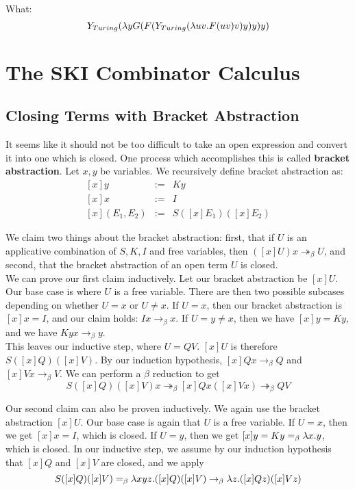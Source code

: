 What:
\begin{equation*}
  Y_{Turing} (\lambda y G(F(Y_{Turing}(\lambda uv.F(uv)v)y)y)y)
\end{equation*}

\section{The SKI Combinator Calculus}
\subsection{Closing Terms with Bracket Abstraction}
It seems like it should not be too difficult to take an open expression and convert it into one which is closed. One process which accomplishes this is called \textbf{bracket abstraction}. Let $x,y$ be variables. We recursively define bracket abstraction as:
\begin{eqnarray*}
  {[x]}y &:=& Ky\\
  {[x]}x &:=& I\\
  {[x]}(E_1,E_2) &:=& S([x]E_1)([x]E_2)
\end{eqnarray*}

We claim two things about the bracket abstraction: first, that if $U$ is an applicative combination of $S,K,I$ and free variables, then $([x]U)x \twoheadrightarrow_\beta U$, and second, that the bracket abstraction of an open term $U$ is closed.\\

We can prove our first claim inductively. Let our bracket abstraction be $[x]U$. Our base case is where $U$ is a free variable. There are then two possible subcases depending on whether $U = x$ or $U \neq x$. If $U = x$, then our bracket abstraction is $[x]x = I$, and our claim holds: $Ix \rightarrow_\beta x$. If $U = y \neq x$, then we have $[x]y = Ky$, and we have $Kyx \rightarrow_\beta y$.\\

This leaves our inductive step, where $U = QV$. $[x]U$ is therefore $S([x]Q)([x]V)$. By our induction hypothesis, $[x]Qx \rightarrow_\beta Q$ and $[x]Vx \rightarrow_\beta V$. We can perform a $\beta$ reduction to get
\begin{equation*}
  S([x]Q)([x]V)x \twoheadrightarrow_\beta [x]Qx([x]Vx) \twoheadrightarrow_\beta QV
\end{equation*}

Our second claim can also be proven inductively. We again use the bracket abstraction $[x]U$. Our base case is again that $U$ is a free variable. If $U = x$, then we get $[x]x = I$, which is closed. If $U = y$, then we get $[x]y = Ky =_\beta \lambda x.y$, which is closed. In our inductive step, we assume by our induction hypothesis that $[x]Q$ and $[x]V$ are closed, and we apply
\begin{equation*}
  S([x]Q)([x]V) =_\beta \lambda xyz.([x]Q)([x]V) \rightarrow_\beta \lambda z.([x]Qz)([x]Vz)
\end{equation*}

